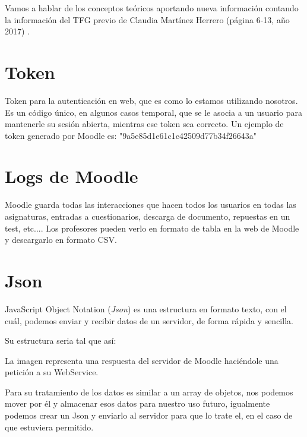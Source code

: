
Vamos a hablar de los conceptos teóricos aportando nueva información contando la información del TFG previo de Claudia Martínez Herrero (página 6-13, año 2017) \cite{claudia}.




\section{Token}\label{token}

Token para la autenticación en web, que es como lo estamos utilizando nosotros. Es un código único, en algunos casos temporal, que se le asocia a un usuario para mantenerle su sesión abierta, mientras ese token sea correcto. Un ejemplo de token generado por Moodle es: "9a5e85d1e61c1c42509d77b34f26643a"

\section{Logs de Moodle}\label{logs-de-moodle}

Moodle guarda todas las interacciones que hacen todos los usuarios en todas las asignaturas, entradas a cuestionarios, descarga de documento, repuestas en un test, etc.... Los profesores pueden verlo en formato de tabla en la web de Moodle y descargarlo en formato CSV.

\section{Json}\label{json}

JavaScript Object Notation (\emph{Json}) es una estructura en formato texto, con el cuál, podemos enviar y recibir datos de un servidor, de forma rápida y sencilla. 

Su estructura seria tal que así:


La imagen representa una respuesta del servidor de Moodle haciéndole una petición a su WebService.

Para su tratamiento de los datos es similar a un array de objetos, nos podemos mover por él y almacenar esos datos para nuestro uso futuro, igualmente podemos crear un Json y enviarlo al servidor para que lo trate el, en el caso de que estuviera permitido.

